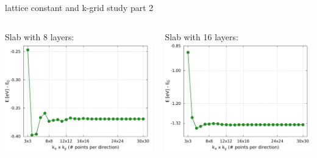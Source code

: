 \begin{frame}{lattice constant and k-grid study part 2}
\begin{columns}
\begin{column}{.4\linewidth}
		\end{column}
		\end{columns}
		\begin{columns}
		\begin{column}{.4\linewidth}
			\scriptsize{
				Slab with 8 layers:%
			}\\
			\includegraphics[width=\linewidth]{andere_bilder/kgrid_1x1x8_layers.pdf}
		\end{column}
		\begin{column}{.4\linewidth}
			\scriptsize{
				Slab with 16 layers: %
			} \\
			\includegraphics[width=\linewidth]{andere_bilder/kgrid_1x1x16_layers.pdf}

\end{column}
\end{columns}
\end{frame}
